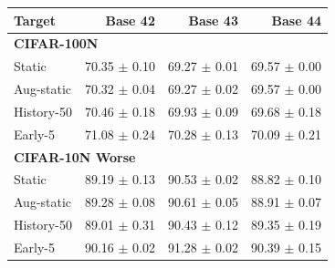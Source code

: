 \begin{tabular}{lrrr}
\toprule
Target & Base 42 & Base 43 & Base 44 \\
\midrule
\multicolumn{4}{l}{\textbf{CIFAR-100N}} \\
Static & 70.35 $\pm$ 0.10 & 69.27 $\pm$ 0.01 & 69.57 $\pm$ 0.00 \\
Aug-static & 70.32 $\pm$ 0.04 & 69.27 $\pm$ 0.02 & 69.57 $\pm$ 0.00 \\
History-50 & 70.46 $\pm$ 0.18 & 69.93 $\pm$ 0.09 & 69.68 $\pm$ 0.18 \\
Early-5 & 71.08 $\pm$ 0.24 & 70.28 $\pm$ 0.13 & 70.09 $\pm$ 0.21 \\
\multicolumn{4}{l}{\textbf{CIFAR-10N Worse}} \\
Static & 89.19 $\pm$ 0.13 & 90.53 $\pm$ 0.02 & 88.82 $\pm$ 0.10 \\
Aug-static & 89.28 $\pm$ 0.08 & 90.61 $\pm$ 0.05 & 88.91 $\pm$ 0.07 \\
History-50 & 89.01 $\pm$ 0.31 & 90.43 $\pm$ 0.12 & 89.35 $\pm$ 0.19 \\
Early-5 & 90.16 $\pm$ 0.02 & 91.28 $\pm$ 0.02 & 90.39 $\pm$ 0.15 \\
\bottomrule
\end{tabular}
